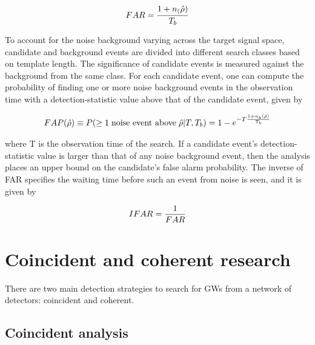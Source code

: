 \documentclass[binding=0.6cm, LaM]{sapthesis}
\begin{document}
		\begin{equation}
			FAR = {{1 + n_(\hat \rho)} \over {T_b}}
		\end{equation}

	To account for the noise background varying across the target signal space, 
	candidate and background events are divided into different search classes based on template length. 
	The significance of candidate events is measured against the background from the same class. 
	For each candidate event, one can compute the probability of finding one or more 
	noise background events in the observation time with a detection-statistic value above that of the candidate event, given by 

		\begin{equation}
			FAP(\hat \rho) \equiv P(\geq 1 \hspace*{0.1cm}\text{noise event above}\hspace*{0.1cm} \hat \rho|T,T_b) = 1 - e^{-T{{1+n_b(\hat \rho)} \over{T_b}}}
		\end{equation}

	where T is the observation time of the search.
	If a candidate event’s detection-statistic value is larger 
	than that of any noise background event, 
	then the analysis places an upper bound on the candidate’s false alarm probability. 
	The inverse of FAR specifies the waiting time before such an event from noise is seen, and it is given by 

		\begin{equation}
			IFAR = {1 \over {FAR}}
		\end{equation}   

\section{Coincident and coherent research}

	There are two main detection strategies to search for GWs 	
	from a network of detectors: coincident and coherent.

\subsection{Coincident analysis}
\end{document}
